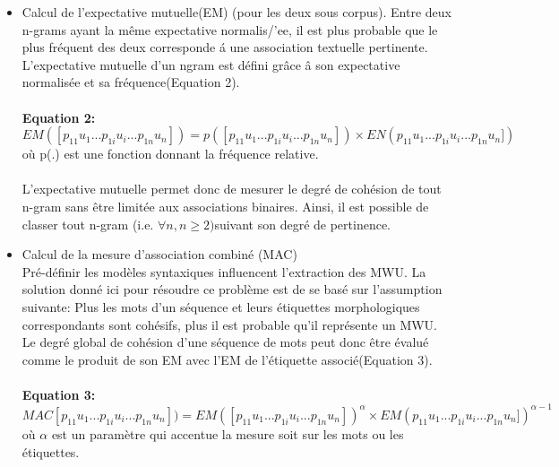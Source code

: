 \documentclass[a4paper,12pt]{article}
\begin{document}
\begin{enumerate}
\begin{itemize}
 \item Calcul de l'expectative mutuelle(EM) (pour les deux sous corpus).
Entre deux n-grams ayant la m\^eme expectative normalis/'ee, il est plus probable que le plus fr\'equent des deux corresponde \'a une association textuelle pertinente. L'expectative mutuelle d'un ngram est d\'efini gr\^ace \^a son expectative normalis\'ee et sa fr\'equence(Equation 2).\\
\\ \textbf{Equation 2:}\\
 $ EM([p_{11}  u_{1} ... p_{1i}  u_{i} ... p_{1n}  u_{n}])= p([p_{11}  u_{1} ... p_{1i}  u_{i} ... p_{1n}  u_{n}]) \times EN(p_{11}  u_{1} ... p_{1i}  u_{i} ... p_{1n}  u_{n}]) $ \\ 
 o\`u p(.) est une fonction donnant la fr\'equence relative. \\
\\  L'expectative mutuelle permet donc de mesurer le degr\'e de coh\'esion de tout n-gram sans \^etre limit\'ee aux associations binaires. Ainsi, il est possible de classer tout n-gram (i.e. $\forall n, n \geqslant 2) $suivant son degr\'e de pertinence.
 
 \item Calcul de la mesure d'association combin\'e (MAC)\ \\
 Pr\'e-d\'efinir les mod\`eles syntaxiques influencent l'extraction des MWU. La solution donn\'e ici pour r\'esoudre ce probl\`eme est de se bas\'e sur l'assumption suivante: Plus les mots   d'un s\'equence et leurs \'etiquettes morphologiques correspondants sont coh\'esifs, plus il est probable qu'il repr\'esente un MWU. Le degr\'e global de coh\'esion d'une s\'equence de mots peut donc \^etre \'evalu\'e comme le produit de son EM avec l'EM de l'\'etiquette associ\'e(Equation 3).  \\
 \\ \textbf{Equation 3:}\\
 $ MAC[p_{11}  u_{1} ... p_{1i}  u_{i} ... p_{1n}  u_{n}])= EM([p_{11}  u_{1} ... p_{1i}  u_{i} ... p_{1n}  u_{n}])^\alpha \times EM(p_{11}  u_{1} ... p_{1i}  u_{i} ... p_{1n}  u_{n}])^{\alpha-1 }$ \\ 
  o\`u $\alpha$ est un param\`etre qui accentue la mesure soit sur les mots ou les \'etiquettes.
 \end{itemize}
 

\end{enumerate}
\end{document}
